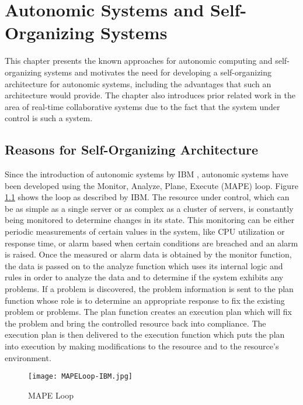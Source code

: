 \chapter{Autonomic Systems and Self-Organizing Systems} %
\label{Chapter2}

This chapter presents the known approaches for autonomic computing and self-organizing systems and motivates the need for developing a self-organizing architecture for autonomic systems, including the advantages that such an architecture would provide. The chapter also introduces prior related work in the area of real-time collaborative systems due to the fact that the system under control is such a system.

\section{Reasons for Self-Organizing Architecture}

Since the introduction of autonomic systems by IBM \cite{IBM:acblueprint}, autonomic systems have been developed using the Monitor, Analyze, Plane, Execute (MAPE) loop. Figure \ref{fig:MAPELoop-IBM} shows the loop as described by IBM. The resource under control, which can be as simple as a single server or as complex as a cluster of servers, is constantly being monitored to determine changes in its state. This monitoring can be either periodic measurements of certain values in the system, like CPU utilization or response time, or alarm based when certain conditions are breached and an alarm is raised. Once the measured or alarm data is obtained by the monitor function, the data is passed on to the analyze function which uses its internal logic and rules in order to analyze the data and to determine if the system exhibits any problems. If a problem is discovered, the problem information is sent to the plan function whose role is to determine an appropriate response to fix the existing problem or problems. The plan function creates an execution plan which will fix the problem and bring the controlled resource back into compliance. The execution plan is then delivered to the execution function which puts the plan into execution by making modifications to the resource and to the resource's environment.

\begin{figure}
	\centering
		\texttt{[image: MAPELoop-IBM.jpg]}
		\caption{MAPE Loop}
	\label{fig:MAPELoop-IBM}
\end{figure}

